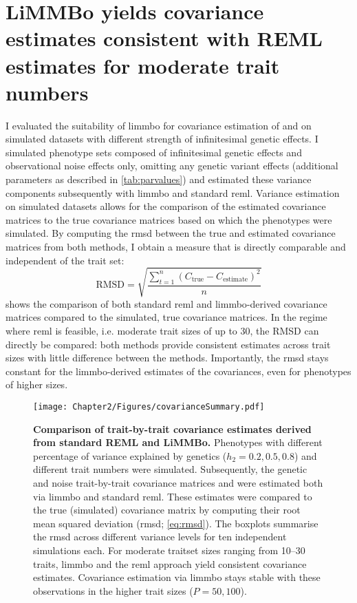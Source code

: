 \section{LiMMBo yields covariance estimates consistent with REML estimates for moderate trait numbers}
\label{section:covariance-limmbo}
I evaluated the suitability of \gls{limmbo} for covariance estimation of  and  on simulated datasets with different strength of infinitesimal genetic effects. I simulated phenotype sets composed of infinitesimal genetic effects  and observational noise effects \tmat{\Psi} only, omitting any genetic variant effects (additional parameters as described in \cref{tab:parvalues}) and estimated these variance components subsequently with \gls{limmbo} and standard \gls{reml}. Variance estimation on simulated datasets allows for the comparison of the estimated covariance matrices to the true covariance matrices based on which the phenotypes were simulated. By computing the \gls{rmsd} between the true and estimated covariance matrices from both methods, I obtain a measure that is directly comparable and independent of the trait set: 
\begin{equation}
\text{RMSD}=\sqrt{\frac{\sum_{t=1}^n (C_{\text{true}} - C_{\text{estimate}})^2}{n}}
\label{eq:rmsd}
\end{equation}
 shows the comparison of both standard \gls{reml} and \gls{limmbo}-derived covariance matrices compared to the simulated, true covariance matrices. In the regime where \gls{reml} is feasible, i.e. moderate trait sizes of up to \num{30}, the RMSD can directly be compared: both methods provide consistent estimates across trait sizes with little difference between the methods. Importantly, the \gls{rmsd} stays constant for the \gls{limmbo}-derived estimates of the covariances, even for phenotypes of higher sizes. 

\begin{figure}[h]
	\centering	
	\texttt{[image: Chapter2/Figures/covarianceSummary.pdf]}\\
	\caption[\textbf{Comparison of trait-by-trait covariance estimates derived from standard REML and LiMMBo.}]{\textbf{Comparison of trait-by-trait covariance estimates derived from standard REML and LiMMBo.} Phenotypes with different percentage of variance explained by genetics (\(h_2={0.2, 0.5, 0.8}\)) and different trait numbers were simulated. Subsequently, the genetic and noise trait-by-trait covariance matrices  and  were estimated both via \gls{limmbo} and standard \gls{reml}. These estimates were compared to the true (simulated) covariance matrix by computing their root mean squared deviation (\gls{rmsd}; \cref{eq:rmsd}). The boxplots summarise the \gls{rmsd} across different variance levels for ten independent simulations each. For moderate traitset sizes ranging from \numrange{10}{30} traits, \gls{limmbo} and the \gls{reml} approach yield consistent covariance estimates. Covariance estimation via \gls{limmbo} stays stable with these observations in the higher trait sizes (\(P={50,100}\)). }
	  \label{fig:covsimilarity}%
\end{figure}

